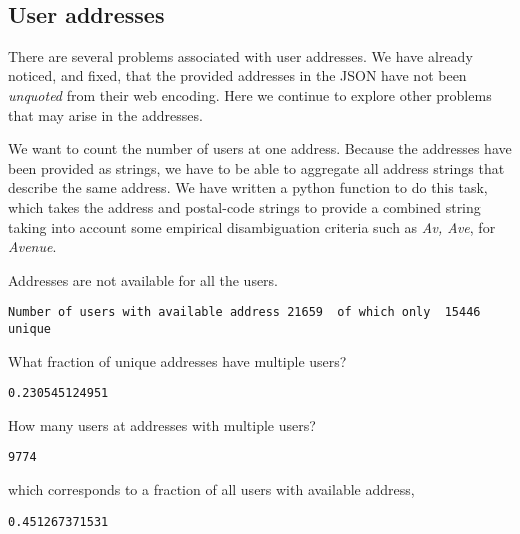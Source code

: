 \documentclass{report}
\begin{document}
    \begin{center}
    \end{center}
    { \hspace*{\fill} \\}
    
    \subsection{User addresses}\label{user-addresses}

There are several problems associated with user addresses. We have
already noticed, and fixed, that the provided addresses in the JSON have
not been \emph{unquoted} from their web encoding. Here we continue to
explore other problems that may arise in the addresses.

We want to count the number of users at one address. Because the
addresses have been provided as strings, we have to be able to aggregate
all address strings that describe the same address. We have written a
python function to do this task, which takes the address and postal-code
strings to provide a combined string taking into account some empirical
disambiguation criteria such as \emph{Av, Ave}, for \emph{Avenue}.

Addresses are not available for all the users.


    \begin{Verbatim}[commandchars=\\\{\}]
Number of users with available address 21659  of which only  15446  unique
    \end{Verbatim}


    What fraction of unique addresses have multiple users?


    \begin{Verbatim}[commandchars=\\\{\}]
0.230545124951
    \end{Verbatim}

    How many users at addresses with multiple users?


    \begin{Verbatim}[commandchars=\\\{\}]
9774
    \end{Verbatim}

    which corresponds to a fraction of all users with available address,


    \begin{Verbatim}[commandchars=\\\{\}]
0.451267371531
    \end{Verbatim}
\end{document}
